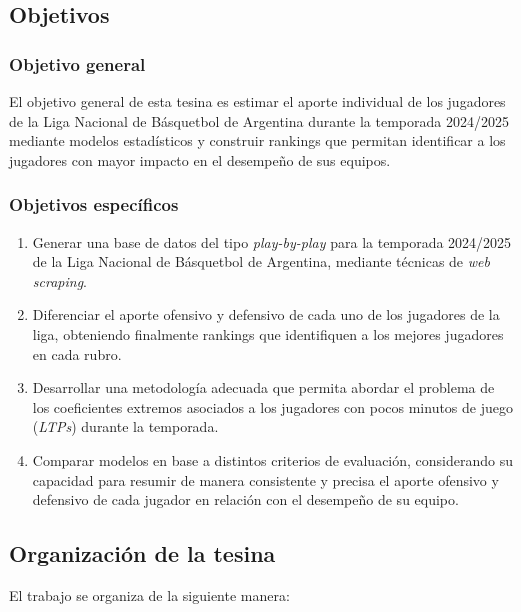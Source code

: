 \documentclass[
  12pt,
]{article}
\begin{document}
\subsection{Objetivos}\label{objetivos}

\subsubsection{Objetivo general}\label{objetivo-general}

El objetivo general de esta tesina es estimar el aporte individual de
los jugadores de la Liga Nacional de Básquetbol de Argentina durante la
temporada 2024/2025 mediante modelos estadísticos y construir rankings
que permitan identificar a los jugadores con mayor impacto en el
desempeño de sus equipos.

\subsubsection{Objetivos específicos}\label{objetivos-especuxedficos}

\begin{enumerate}
\def\labelenumi{\arabic{enumi})}
\item
  Generar una base de datos del tipo \emph{play-by-play} para la
  temporada 2024/2025 de la Liga Nacional de Básquetbol de Argentina,
  mediante técnicas de \emph{web scraping}.
\item
  Diferenciar el aporte ofensivo y defensivo de cada uno de los
  jugadores de la liga, obteniendo finalmente rankings que identifiquen
  a los mejores jugadores en cada rubro.
\item
  Desarrollar una metodología adecuada que permita abordar el problema
  de los coeficientes extremos asociados a los jugadores con pocos
  minutos de juego (\emph{LTPs}) durante la temporada.
\item
  Comparar modelos en base a distintos criterios de evaluación,
  considerando su capacidad para resumir de manera consistente y precisa
  el aporte ofensivo y defensivo de cada jugador en relación con el
  desempeño de su equipo.
\end{enumerate}

\subsection{Organización de la
tesina}\label{organizaciuxf3n-de-la-tesina}

El trabajo se organiza de la siguiente manera:
\end{document}
